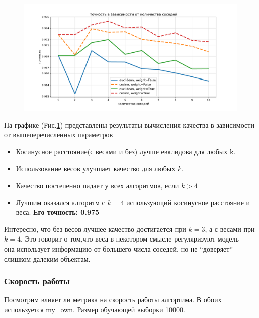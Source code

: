 \documentclass[12pt,fleqn]{article}
\begin{document}
\begin{figure}
    \centering
    \includegraphics[width=17cm]{task2.pdf}
    \caption{}
    \label{pic2}
\end{figure}

На графике (Рис.\ref{pic2}) представлены результаты вычисления качества в зависимости от
вышеперечисленных параметров


\begin{itemize}
    \item Косинусное расстояние(с весами и без) лучше евклидова для любых k.
    \item Использование весов улучшает качество для любых $k$.
    \item Качество постепенно падает у всех алгоритмов, если $k>4$
    \item Лучшим оказался алгоритм с $k=4$ использующий косинусное расстояние и веса.
    \textbf{Его точность: 0.975}
\end{itemize}

Интересно, что без весов лучшее качество достигается при $k=3$, а с весами  при $k=4$. 
Это говорит о том,что веса в некотором смысле регуляризуют модель --- она
использует информацию от большего числа соседей, но не ``доверяет'' слишком далеким объектам.

\newpage
\subsubsection{Скорость работы}
Посмотрим влияет ли метрика на скорость работы алгортима. В обоих используется my\_own.
Размер обучающей выборки 10000.
\end{document}
